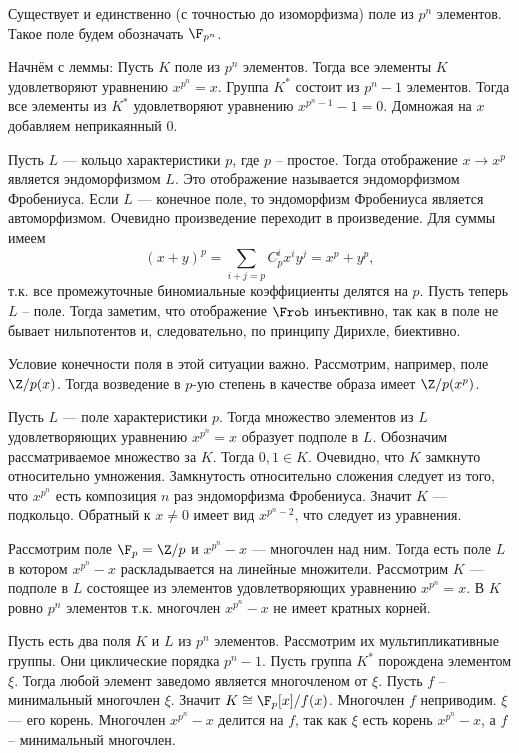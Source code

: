 \thrm Существует и единственно (с точностью до изоморфизма) поле из $p^n$ элементов. Такое поле будем обозначать $\F_{p^n}$.
\ethrm

Начнём с леммы:
\lm Пусть $K$ поле из $p^n$ элементов. Тогда все элементы $K$ удовлетворяют уравнению $x^{p^n}=x$.
\elm
\proof Группа $K^*$ состоит из $p^n-1$ элементов. Тогда все элементы из $K^*$ удовлетворяют уравнению $x^{p^n-1}-1=0$. Домножая на $x$ добавляем неприкаянный 0.
\endproof


\lm Пусть $L$ --- кольцо характеристики $p$, где $p$ -- простое. Тогда отображение $x\to x^{p}$ является эндоморфизмом $L$. Это отображение называется эндоморфизмом Фробениуса. Если $L$ --- конечное поле, то эндоморфизм Фробениуса является автоморфизмом. 
\elm
\proof Очевидно произведение переходит в произведение. Для суммы имеем $$(x+y)^p=\sum_{i+j=p} C_p^i x^iy^j= x^p+y^p,$$ т.к. все промежуточные биномиальные коэффициенты делятся на $p$. Пусть теперь $L$ -- поле. Тогда заметим, что отображение $\Frob$ инъективно, так как в поле не бывает нильпотентов и, следовательно, по принципу Дирихле, биективно.
\endproof

\rm Условие конечности поля в этой ситуации важно. Рассмотрим, например, поле $\Z/p(x)$. Тогда возведение в $p$-ую степень в качестве образа имеет $\Z/p(x^p)$.
\erm

\lm Пусть $L$ --- поле характеристики $p$. Тогда множество элементов из $L$ удовлетворяющих уравнению $x^{p^n}=x$ образует подполе в $L$.
\elm
\proof Обозначим рассматриваемое множество за $K$. Тогда $0,1\in K$. Очевидно, что $K$ замкнуто относительно умножения. Замкнутость относительно сложения следует из того, что $x^{p^n}$ есть композиция $n$ раз эндоморфизма Фробениуса. Значит $K$ --- подкольцо. Обратный к $x\neq 0$ имеет вид $x^{p^n-2}$, что следует из уравнения.
\endproof
 

Рассмотрим поле $\F_p=\Z/p$ и $x^{p^n}-x$ --- многочлен над ним. Тогда есть поле $L$ в котором   $x^{p^n}-x$ раскладывается на линейные множители. Рассмотрим $K$ --- подполе в $L$ состоящее из элементов удовлетворяющих уравнению $x^{p^n}=x$. В $K$ ровно $p^n$ элементов т.к. многочлен $x^{p^n}-x$ не имеет кратных корней.

Пусть есть два поля $K$ и $L$ из $p^n$ элементов. Рассмотрим их мультипликативные группы. Они циклические порядка $p^n-1$. Пусть группа $K^*$ порождена элементом $\xi$. Тогда любой элемент заведомо является многочленом от $\xi$. Пусть $f$ -- минимальный многочлен $\xi$. Значит $K\cong\F_p[x]/f(x)$. Многочлен $f$ неприводим. $\xi$ --- его корень. Многочлен $x^{p^n}-x$ делится на $f$, так как $\xi$ есть корень $x^{p^n}-x$, а $f$ -- минимальный многочлен.

